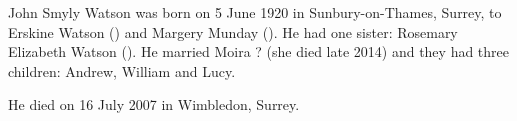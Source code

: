 
John Smyly Watson was born on 5 June 1920 in	Sunbury-on-Thames, Surrey, to Erskine Watson () and
Margery Munday (). He had one sister:  Rosemary Elizabeth Watson ().
He married Moira ? (she died late 2014) and they had three children: Andrew, William and Lucy.

He died on 16 July 2007 in Wimbledon, Surrey.
